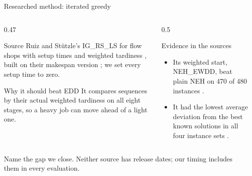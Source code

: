 \documentclass[aspectratio=169,11pt]{beamer}
\renewcommand{\fine}{\unskip\space}
\newcommand{\point}[2]{\par\medskip\sumpara #1\sumparaend
  {\color{uablue}\fin #2\fine}\par}
\begin{document}
\begin{frame}{Researched method: iterated greedy}
\begin{columns}[T,onlytextwidth]
\begin{column}{0.47\textwidth}
\begin{block}{Source}
\small
Ruiz and Stützle's IG\_RS\_LS for flow shops with setup times and weighted tardiness \cite{ruiz2008igwt}, built on their makespan version \cite{ruiz2007ig}; we set every setup time to zero.
\end{block}
\begin{block}{Why it should beat EDD}
\small
It compares sequences by their actual weighted tardiness on all eight stages, so a heavy job can move ahead of a light one.
\end{block}
\end{column}
\begin{column}{0.5\textwidth}
\begin{block}{Evidence in the sources}
\small
\begin{itemize}
\item Its weighted start, NEH\_EWDD, beat plain NEH on 470 of 480 instances \cite{ruiz2008igwt}.
\item It had the lowest average deviation from the best known solutions in all four instance sets \cite{ruiz2008igwt}.
\end{itemize}
\end{block}
\end{column}
\end{columns}
\point{Name the gap we close.}{Neither source has release dates; our timing includes them in every evaluation.}
\end{frame}
\end{document}
